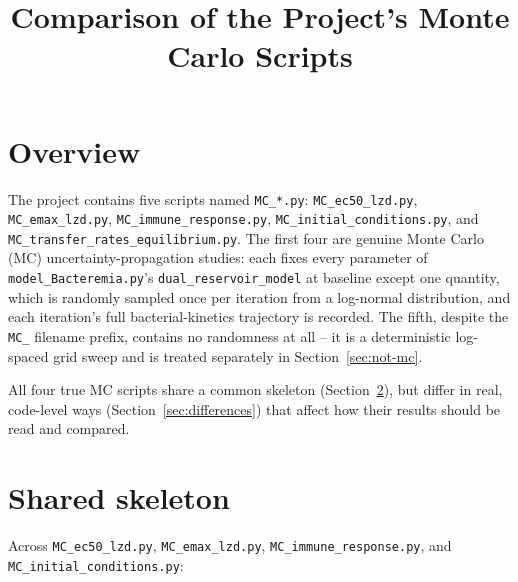 \documentclass[11pt]{article}
\title{Comparison of the Project's Monte Carlo Scripts}
\author{}
\date{}
\begin{document}
\maketitle

\section{Overview}

The project contains five scripts named \texttt{MC\_*.py}:
\texttt{MC\_ec50\_lzd.py}, \texttt{MC\_emax\_lzd.py},
\texttt{MC\_immune\_response.py}, \texttt{MC\_initial\_conditions.py}, and
\texttt{MC\_transfer\_rates\_equilibrium.py}. The first four are genuine
Monte Carlo (MC) uncertainty-propagation studies: each fixes every parameter
of \texttt{model\_Bacteremia.py}'s \texttt{dual\_reservoir\_model} at
baseline except one quantity, which is randomly sampled once per iteration
from a log-normal distribution, and each iteration's full bacterial-kinetics
trajectory is recorded. The fifth, despite the \texttt{MC\_} filename prefix,
contains no randomness at all -- it is a deterministic log-spaced grid sweep
and is treated separately in Section~\ref{sec:not-mc}.

All four true MC scripts share a common skeleton (Section~\ref{sec:shared}),
but differ in real, code-level ways (Section~\ref{sec:differences}) that
affect how their results should be read and compared.

\section{Shared skeleton}
\label{sec:shared}

Across \texttt{MC\_ec50\_lzd.py}, \texttt{MC\_emax\_lzd.py},
\texttt{MC\_immune\_response.py}, and \texttt{MC\_initial\_conditions.py}:
\end{document}
